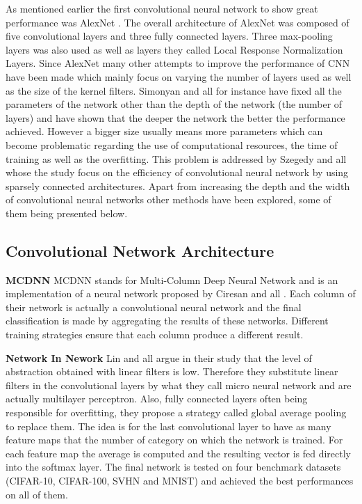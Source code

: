   As mentioned earlier the first convolutional neural network to show great performance was AlexNet \cite{krizhevsky2012imagenet}. The overall architecture of AlexNet was composed of five convolutional layers and three fully connected layers. Three max-pooling layers was also used as well as layers they called Local Response Normalization Layers. Since AlexNet many other attempts to improve the performance of CNN have been made which mainly focus on varying the number of layers used as well as the size of the kernel filters. Simonyan and all \cite{simonyan2014very} for instance have fixed all the parameters of the network other than the depth of the network (the number of layers) and have shown that the deeper the network the better the performance achieved. However a bigger size usually means more parameters which can become problematic regarding the use of computational resources, the time of training as well as the overfitting. This problem is addressed by Szegedy and all \cite{szegedy2015going} whose the study focus on the efficiency of convolutional neural network by using sparsely connected architectures. Apart from increasing the depth and the width of convolutional neural networks other methods have been explored, some of them being presented below.

    \subsection{Convolutional Network Architecture}

    \textbf{MCDNN}
    MCDNN stands for Multi-Column Deep Neural Network and is an implementation of a neural network proposed by Ciresan and all \cite{ciresan2012multi}. Each column of their network is actually a convolutional neural network and the final classification is made by aggregating the results of these networks. Different training strategies ensure that each column produce a different result.

    \bigskip
    \textbf{Network In Nework}
    Lin and all argue in their study \cite{lin2013network} that the level of abstraction obtained with linear filters is low. Therefore they substitute linear filters in the convolutional layers by what they call micro neural network and are actually multilayer perceptron. Also, fully connected layers often being responsible for overfitting, they propose a strategy called global average pooling to replace them. The idea is for the last convolutional layer to have as many feature maps that the number of category on which the network is trained. For each feature map the average is computed and the resulting vector is fed directly into the softmax layer. The final network is tested on four benchmark datasets (CIFAR-10, CIFAR-100, SVHN and MNIST) and achieved the best performances on all of them.

